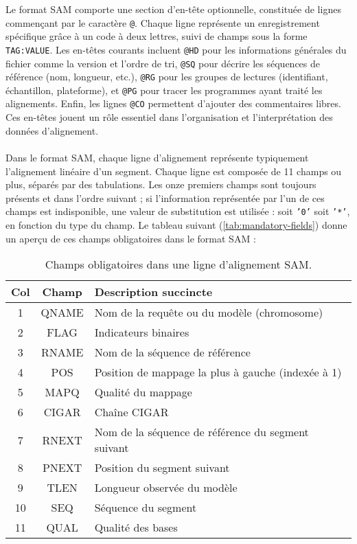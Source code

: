 Le format SAM comporte une section d'en-tête optionnelle, constituée de lignes commençant par le caractère \texttt{@}.
Chaque ligne représente un enregistrement spécifique grâce à un code à deux lettres, suivi de champs sous la forme \texttt{TAG:VALUE}.
Les en-têtes courants incluent \texttt{@HD} pour les informations générales du fichier comme la version et l'ordre de tri, \texttt{@SQ} pour décrire les séquences de référence (nom, longueur, etc.), \texttt{@RG} pour les groupes de lectures (identifiant, échantillon, plateforme), et \texttt{@PG} pour tracer les programmes ayant traité les alignements.
Enfin, les lignes \texttt{@CO} permettent d'ajouter des commentaires libres.
Ces en-têtes jouent un rôle essentiel dans l'organisation et l'interprétation des données d'alignement.
\\\\
Dans le format SAM, chaque ligne d'alignement représente typiquement l'alignement linéaire d'un segment.
Chaque ligne est composée de 11 champs ou plus, séparés par des tabulations.
Les onze premiers champs sont toujours présents et dans l'ordre suivant ; si l'information représentée par l'un de ces champs est indisponible, une valeur de substitution est utilisée : soit \texttt{'0'} soit \texttt{'*'}, en fonction du type du champ.
Le tableau suivant (\autoref{tab:mandatory-fields}) donne un aperçu de ces champs obligatoires dans le format SAM :

\begin{table}[H]
    \centering
    \begin{tabular}{|c|c|p{9cm}|}
        \hline
        \textbf{Col} & \textbf{Champ} & \textbf{Description succincte} \\
        \hline
        1 & QNAME & Nom de la requête ou du modèle (chromosome) \\
        2 & FLAG & Indicateurs binaires \\
        3 & RNAME & Nom de la séquence de référence \\
        4 & POS & Position de mappage la plus à gauche (indexée à 1) \\
        5 & MAPQ & Qualité du mappage \\
        6 & CIGAR & Chaîne CIGAR \\
        7 & RNEXT & Nom de la séquence de référence du segment suivant \\
        8 & PNEXT & Position du segment suivant \\
        9 & TLEN & Longueur observée du modèle \\
        10 & SEQ & Séquence du segment \\
        11 & QUAL & Qualité des bases \\
        \hline
    \end{tabular}
    \caption{Champs obligatoires dans une ligne d'alignement SAM.}
    \label{tab:mandatory-fields}
\end{table}

